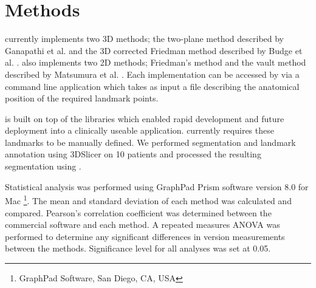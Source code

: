 \section{Methods}
\label{sec:methods}
\sksglenoid currently implements two 3D methods; the two-plane method described by Ganapathi et al. \cite{PMID:20933439} and the 3D corrected 
Friedman method described by Budge et al. \cite{BUDGE2011577}. \sksglenoid also implements two
2D methods; Friedman's method \cite{PMID:1522089} and the vault method described by Matsumura et al. \cite{PMID:24618285}. Each implementation can be accessed by via a command line application which takes as 
input a file describing the anatomical position of the required landmark points. 

\sksglenoid is built on top of the \sksurgery \cite{PMID:32436132} libraries which enabled 
rapid development and future deployment into a clinically useable application.  
\sksglenoid currently requires these landmarks to be manually defined. We performed segmentation 
and landmark annotation using 3DSlicer \cite{Kikinis2014} on 10 patients and processed
the resulting 
segmentation using \sksglenoidns.

Statistical analysis was performed using GraphPad Prism software version 8.0 for
Mac \footnote{GraphPad Software, San Diego, CA, USA}. The mean and standard deviation of 
each method was calculated and compared. Pearson’s correlation coefficient was 
determined between the commercial software and each method. 
A repeated measures ANOVA was performed to determine any significant differences
in version measurements between the methods. Significance level for all analyses was set at 0.05.
